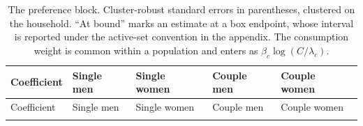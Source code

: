 \documentclass[11pt,a4paper]{article}
\begin{document}
\small\setlength{\tabcolsep}{3pt}\begin{longtable}[]{@{}
  >{\raggedright\arraybackslash}p{}
  >{\raggedright\arraybackslash}p{}
  >{\raggedright\arraybackslash}p{}
  >{\raggedright\arraybackslash}p{}
  >{\raggedright\arraybackslash}p{}@{}}
\caption{The preference block. Cluster-robust standard errors in parentheses, clustered on the household. ``At bound'' marks an estimate at a box endpoint, whose interval is reported under the active-set convention in the appendix. The consumption weight is common within a population and enters as \(\beta_c\log(C/\lambda_c)\).}\tabularnewline
\toprule\noalign{}
\begin{minipage}[b]{\linewidth}\raggedright
Coefficient
\end{minipage} & \begin{minipage}[b]{\linewidth}\raggedright
Single men
\end{minipage} & \begin{minipage}[b]{\linewidth}\raggedright
Single women
\end{minipage} & \begin{minipage}[b]{\linewidth}\raggedright
Couple men
\end{minipage} & \begin{minipage}[b]{\linewidth}\raggedright
Couple women
\end{minipage} \\
\midrule\noalign{}
\endfirsthead
\toprule\noalign{}
\begin{minipage}[b]{\linewidth}\raggedright
Coefficient
\end{minipage} & \begin{minipage}[b]{\linewidth}\raggedright
Single men
\end{minipage} & \begin{minipage}[b]{\linewidth}\raggedright
Single women
\end{minipage} & \begin{minipage}[b]{\linewidth}\raggedright
Couple men
\end{minipage} & \begin{minipage}[b]{\linewidth}\raggedright
Couple women
\end{minipage} \\
\midrule\noalign{}
\endhead
\bottomrule\noalign{}
\endlastfoot

\end{longtable}
\end{document}
